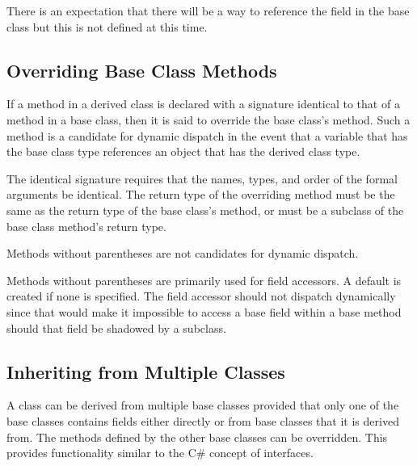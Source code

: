 \begin{openissue}
There is an expectation that there will
be a way to reference the field in the base class but this is not
defined at this time.
\end{openissue}

\subsection{Overriding Base Class Methods}
\label{Overriding_Base_Class_Methods}

If a method in a derived class is declared with a
signature identical to that of a method in a base class, then it is said to override the
base class's method.  Such a method is a candidate for dynamic
dispatch in the event that a variable that has the base class type
references an object that has the derived class type.

The identical signature requires that the names, types, and order of
the formal arguments be identical. The return type of the overriding
method must be the same as the return type of the base class's method,
or must be a subclass of the base class method's return type.

Methods without parentheses are not candidates for dynamic dispatch.
\begin{rationale}
Methods without parentheses are primarily used for field accessors.  
A default is created if none is specified.  The field accessor
should not dispatch dynamically since that would make it
impossible to access a base field within a base method should that
field be shadowed by a subclass.
\end{rationale}

\subsection{Inheriting from Multiple Classes}
\label{Inheriting_from_Multiple_Classes}

A class can be derived from multiple base classes provided that only
one of the base classes contains fields either directly or from base
classes that it is derived from.  The methods defined by the other
base classes can be overridden.  This provides functionality similar to the C\#
concept of interfaces.

